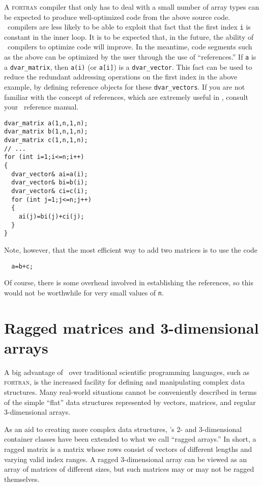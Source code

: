 \documentclass{admbmanual}
\begin{document}
A \textsc{fortran} compiler that only has to deal with a small number of array
types can be expected to produce well-optimized code from the above source code.
\cplus\ compilers are less likely to be able to exploit that fact that the first
index \texttt{i} is constant in the inner loop. It is to be expected that, in
the future, the ability of \cplus\ compilers to optimize code will improve. In
the meantime, code segments such as the above can be optimized by the user
through the use of ``references.'' If \texttt{a} is a \texttt{dvar\_matrix},
then \texttt{a(i)} (or \texttt{a[i]}) is a \texttt{dvar\_vector}. This fact can
be used to reduce the redundant addressing operations on the first index in the
above example, by defining reference objects for these \texttt{dvar\_vectors}.
If you are not familiar with the concept of references, which are extremely
useful in \cplus, consult your \cplus\ reference manual.
\begin{lstlisting}
dvar_matrix a(1,n,1,n);
dvar_matrix b(1,n,1,n);
dvar_matrix c(1,n,1,n);
// ...
for (int i=1;i<=n;i++)
{
  dvar_vector& ai=a(i);
  dvar_vector& bi=b(i);
  dvar_vector& ci=c(i);
  for (int j=1;j<=n;j++)
  {
    ai(j)=bi(j)+ci(j);
  }
}
\end{lstlisting}
Note, however, that the most efficient way to add two matrices is to use the
code
\begin{lstlisting}
  a=b+c;
\end{lstlisting}

Of course, there is some overhead involved in establishing the references, so
this would not be worthwhile for very small values of \texttt{n}.

\section{Ragged matrices and 3-dimensional arrays}

A big advantage of \cplus\ over traditional scientific programming languages,
such as \textsc{fortran}, is the increased facility for defining and
manipulating complex data structures. Many real-world situations cannot be
conveniently described in terms of the simple ``flat'' data structures
represented by vectors, matrices, and regular 3-dimensional arrays.

As an aid to creating more complex data structures, \scAD's 2- and 3-dimensional
container classes have been extended to what we call ``ragged arrays.'' In
short, a ragged matrix is a matrix whose rows consist of vectors of different
lengths and varying valid index ranges. A ragged 3-dimensional array can be
viewed as an array of matrices of different sizes, but such matrices may or may
not be ragged themselves.
\end{document}

